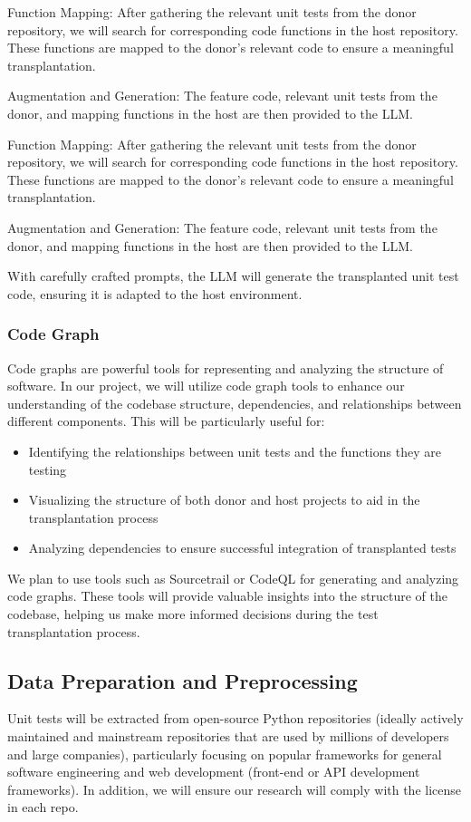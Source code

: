 \documentclass[sigconf]{acmart}
\begin{document}
Function Mapping: After gathering the relevant unit tests from the donor repository, we will search for corresponding code functions in the host repository. These functions are mapped to the donor’s relevant code to ensure a meaningful transplantation.

Augmentation and Generation: The feature code, relevant unit tests from the donor, and mapping functions in the host are then provided to the LLM.

Function Mapping: After gathering the relevant unit tests from the donor repository, we will search for corresponding code functions in the host repository. These functions are mapped to the donor’s relevant code to ensure a meaningful transplantation.

Augmentation and Generation: The feature code, relevant unit tests from the donor, and mapping functions in the host are then provided to the LLM.

With carefully crafted prompts, the LLM will generate the transplanted unit test code, ensuring it is adapted to the host environment.

\subsubsection{Code Graph}
Code graphs are powerful tools for representing and analyzing the structure of software. In our project, we will utilize code graph tools to enhance our understanding of the codebase structure, dependencies, and relationships between different components. This will be particularly useful for:
\begin{itemize}
\item Identifying the relationships between unit tests and the functions they are testing
\item Visualizing the structure of both donor and host projects to aid in the transplantation process
\item Analyzing dependencies to ensure successful integration of transplanted tests
\end{itemize}
We plan to use tools such as Sourcetrail or CodeQL for generating and analyzing code graphs. These tools will provide valuable insights into the structure of the codebase, helping us make more informed decisions during the test transplantation process.

\subsection{Data Preparation and Preprocessing}
%
Unit tests will be extracted from open-source Python repositories (ideally actively maintained and mainstream repositories that are used by millions of developers and large companies), particularly focusing on popular frameworks for general software engineering and web development (front-end or API development frameworks).
%
In addition, we will ensure our research will comply with the license in each repo.
\end{document}
